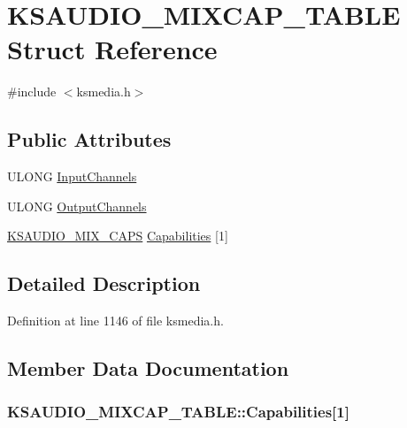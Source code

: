 \hypertarget{struct_k_s_a_u_d_i_o___m_i_x_c_a_p___t_a_b_l_e}{}\section{K\+S\+A\+U\+D\+I\+O\+\_\+\+M\+I\+X\+C\+A\+P\+\_\+\+T\+A\+B\+LE Struct Reference}
\label{struct_k_s_a_u_d_i_o___m_i_x_c_a_p___t_a_b_l_e}


{\ttfamily \#include $<$ksmedia.\+h$>$}

\subsection*{Public Attributes}
\begin{DoxyCompactItemize}
\item 
U\+L\+O\+NG \hyperlink{struct_k_s_a_u_d_i_o___m_i_x_c_a_p___t_a_b_l_e_aeebf10ed548852b997e1b0b1f25dc583}{Input\+Channels}
\item 
U\+L\+O\+NG \hyperlink{struct_k_s_a_u_d_i_o___m_i_x_c_a_p___t_a_b_l_e_af61fe97ed4dc6b0b96695f7f59bba9c5}{Output\+Channels}
\item 
\hyperlink{struct_k_s_a_u_d_i_o___m_i_x___c_a_p_s}{K\+S\+A\+U\+D\+I\+O\+\_\+\+M\+I\+X\+\_\+\+C\+A\+PS} \hyperlink{struct_k_s_a_u_d_i_o___m_i_x_c_a_p___t_a_b_l_e_a1eb430d71d247a25546fc9565f2ee2bc}{Capabilities} \mbox{[}1\mbox{]}
\end{DoxyCompactItemize}


\subsection{Detailed Description}


Definition at line 1146 of file ksmedia.\+h.



\subsection{Member Data Documentation}
\subsubsection[{\texorpdfstring{Capabilities}{Capabilities}}]{ K\+S\+A\+U\+D\+I\+O\+\_\+\+M\+I\+X\+C\+A\+P\+\_\+\+T\+A\+B\+L\+E\+::\+Capabilities\mbox{[}1\mbox{]}}\hypertarget{struct_k_s_a_u_d_i_o___m_i_x_c_a_p___t_a_b_l_e_a1eb430d71d247a25546fc9565f2ee2bc}{}\label{struct_k_s_a_u_d_i_o___m_i_x_c_a_p___t_a_b_l_e_a1eb430d71d247a25546fc9565f2ee2bc}


